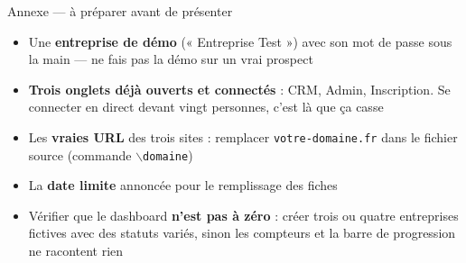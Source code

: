 \documentclass[aspectratio=169,11pt]{beamer}
\newcommand{\domaine}{votre-domaine.fr}
\newcommand{\cle}[1]{\textbf{\textcolor{noirApp}{#1}}}
\begin{document}
\begin{frame}{Annexe --- à préparer avant de présenter}
  \small
  \begin{itemize}
    \item Une \cle{entreprise de démo} (« Entreprise Test ») avec son mot de
          passe sous la main --- ne fais pas la démo sur un vrai prospect
    \item \cle{Trois onglets déjà ouverts et connectés} : CRM, Admin,
          Inscription. Se connecter en direct devant vingt personnes, c'est là
          que ça casse
    \item Les \cle{vraies URL} des trois sites : remplacer \texttt{\domaine}
          dans le fichier source (commande \texttt{$\backslash$domaine})
    \item La \cle{date limite} annoncée pour le remplissage des fiches
    \item Vérifier que le dashboard \cle{n'est pas à zéro} : créer trois ou
          quatre entreprises fictives avec des statuts variés, sinon les
          compteurs et la barre de progression ne racontent rien
  \end{itemize}
\end{frame}
\end{document}
